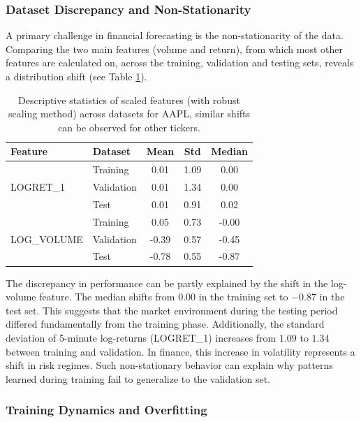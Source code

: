 \documentclass[12pt,twoside=false,a4paper,parskip]{scrbook}
\begin{document}
\subsubsection{Dataset Discrepancy and Non-Stationarity}
A primary challenge in financial forecasting is the non-stationarity of the data. Comparing the two main features (volume and return), from which most other features are calculated on, across the training, validation and testing sets, reveals a distribution shift (see Table \ref{tab:dataset_discrepancy}).


\begin{table}[htbp]
\centering
\caption[Descriptive statistics of scaled features]{Descriptive statistics of scaled features (with robust scaling method) across datasets for AAPL, similar shifts can be observed for other tickers.}
\label{tab:dataset_discrepancy}
\begin{tabular}{@{}llccc@{}}
\toprule
\textbf{Feature} & \textbf{Dataset} & \textbf{Mean} & \textbf{Std} & \textbf{Median} \\ \midrule
\multirow{3}{*}{LOGRET\_1} & Training & 0.01 & 1.09 & 0.00 \\
 & Validation & 0.01 & 1.34 & 0.00 \\
 & Test & 0.01 & 0.91 & 0.02 \\ \midrule
\multirow{3}{*}{LOG\_VOLUME} & Training & 0.05 & 0.73 & -0.00 \\
 & Validation & -0.39 & 0.57 & -0.45 \\
 & Test & -0.78 & 0.55 & -0.87 \\ \bottomrule
\end{tabular}
\end{table}

The discrepancy in performance can be partly explained by the shift in the log-volume feature. The median shifts from $0.00$ in the training set to $-0.87$ in the test set. This suggests that the market environment during the testing period differed fundamentally from the training phase. Additionally, the standard deviation of 5-minute log-returns (LOGRET\_1) increases from $1.09$ to $1.34$ between training and validation. In finance, this increase in volatility represents a shift in risk regimes. Such non-stationary behavior can explain why patterns learned during training fail to generalize to the validation set.


\subsubsection{Training Dynamics and Overfitting}
\end{document}
